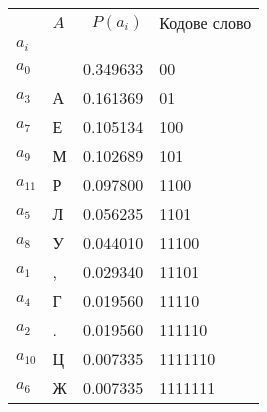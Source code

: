 \begin{tabular}{llrl}
\toprule
 & $A$ & $P(a_i)$ & Кодове слово \\
$a_i$ &  &  &  \\
\midrule
$a_{0}$ &   & 0.349633 & 00 \\
$a_{3}$ & А & 0.161369 & 01 \\
$a_{7}$ & Е & 0.105134 & 100 \\
$a_{9}$ & М & 0.102689 & 101 \\
$a_{11}$ & Р & 0.097800 & 1100 \\
$a_{5}$ & Л & 0.056235 & 1101 \\
$a_{8}$ & У & 0.044010 & 11100 \\
$a_{1}$ & , & 0.029340 & 11101 \\
$a_{4}$ & Г & 0.019560 & 11110 \\
$a_{2}$ & . & 0.019560 & 111110 \\
$a_{10}$ & Ц & 0.007335 & 1111110 \\
$a_{6}$ & Ж & 0.007335 & 1111111 \\
\bottomrule
\end{tabular}
